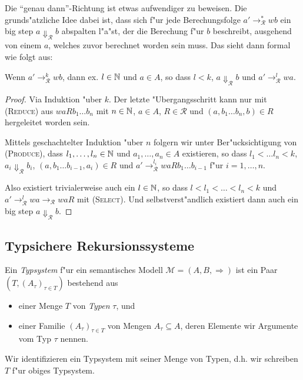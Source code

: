\documentclass[12pt,a4paper,final]{article}
\begin{document}
Die ``genau dann''-Richtung ist etwas aufwendiger zu beweisen. Die grund\-s"atzliche Idee dabei
ist, dass sich f"ur jede Berechungsfolge \mbox{$a' \rightarrow_{\mathcal{R}}^* wb$} ein big step
\mbox{$a \Downarrow_{\mathcal{R}} b$} abspalten l"a"st, der die Berechung f"ur $b$ beschreibt, ausgehend
von einem $a$, welches zuvor berechnet worden sein muss. Das sieht dann formal wie folgt aus:
\begin{lemma}
  Wenn \mbox{$a' \rightarrow_{\mathcal{R}}^k wb$}, dann ex. \mbox{$l \in \mathbb N$} und \mbox{$a \in A$}, so dass
  \mbox{$l < k$}, \mbox{$a \Downarrow_{\mathcal{R}} b$} und \mbox{$a' \rightarrow_{\mathcal{R}}^l wa$}.
\end{lemma}

\begin{proof}
  Via Induktion "uber $k$.
  Der letzte "Ubergangsschritt kann nur mit \textsc{(Reduce)} aus \mbox{$waRb_1 \ldots b_n$}
  mit \mbox{$n \in \mathbb N$}, \mbox{$a \in A$}, \mbox{$R \in \mathcal{R}$} und \mbox{$(a,b_1 \ldots b_n,b) \in R$}
  hergeleitet worden sein.

  Mittels geschachtelter Induktion "uber $n$ folgern wir unter Ber"ucksichtigung von \textsc{(Produce)},
  dass \mbox{$l_1,\ldots,l_n \in \mathbb N$} und \mbox{$a_1,\ldots,a_n \in A$} existieren, so dass
  \mbox{$l_1 < \ldots l_n < k$}, \mbox{$a_i \Downarrow_{\mathcal{R}} b_i$}, \mbox{$(a,b_1 \ldots b_{i-1},a_i) \in R$}
  und \mbox{$a' \rightarrow_{\mathcal{R}}^{l_i} waRb_1 \ldots b_{i-1}$} f"ur \mbox{$i=1,\ldots,n$}.

  Also existiert trivialerweise auch ein \mbox{$l \in \mathbb N$}, so dass \mbox{$l < l_1 < \ldots < l_n < k$} und
  \mbox{$a' \rightarrow_{\mathcal{R}}^l wa \rightarrow_{\mathcal{R}} waR$} mit \textsc{(Select)}. Und selbstverst"andlich
  existiert dann auch ein big step $a \Downarrow_{\mathcal{R}} b$.
\end{proof}



\subsection{Typsichere Rekursionssysteme}
\label{sec:Typsichere_Rekursionssysteme}

Ein \emph{Typsystem} f"ur ein semantisches Modell \mbox{$\mathcal{M} = (A,B,\Rightarrow)$}
ist ein Paar \mbox{$(T,(A_\tau)_{\tau \in T})$} bestehend aus
\begin{itemize}
\item einer Menge $T$ von \emph{Typen} $\tau$, und
\item einer Familie \mbox{$(A_\tau)_{\tau \in T}$} von Mengen \mbox{$A_\tau \subseteq A$},
  deren Elemente wir Argumente vom Typ $\tau$ nennen.
\end{itemize}
Wir identifizieren ein Typsystem mit seiner Menge von Typen, d.h.\xspace wir schreiben $T$ f"ur obiges
Typsystem.
\end{document}
